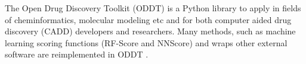 The Open Drug Discovery Toolkit (ODDT) is a Python library to apply in fields of cheminformatics, molecular modeling etc and for both computer aided drug discovery (CADD) developers and researchers. Many methods, such as machine learning scoring functions (RF-Score and NNScore) and wraps other external software are reimplemented in ODDT . 